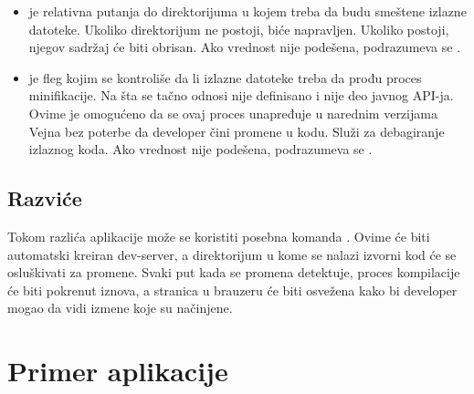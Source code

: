 \begin{itemize}
\item {} je relativna putanja do direktorijuma u kojem treba da budu smeštene izlazne datoteke.
  Ukoliko direktorijum ne postoji, biće napravljen.
  Ukoliko postoji, njegov sadržaj će biti obrisan.
  Ako vrednost nije podešena, podrazumeva se .
\item {} je fleg kojim se kontroliše da li izlazne datoteke treba da prođu proces minifikacije.
  Na šta se tačno odnosi  nije definisano i nije deo javnog API-ja.
  Ovime je omogućeno da se ovaj proces unapređuje u narednim verzijama Vejna bez poterbe da developer čini promene u kodu.
  Služi za debagiranje izlaznog koda.
  Ako vrednost nije podešena, podrazumeva se .
\end{itemize}

\subsection{Razviće}

Tokom razlića aplikacije može se koristiti posebna komanda .
Ovime će biti automatski kreiran dev-server, a  direktorijum u kome se nalazi izvorni kod će se osluškivati za promene.
Svaki put kada se promena detektuje, proces kompilacije će biti pokrenut iznova, a stranica u brauzeru će biti osvežena kako bi developer mogao da vidi izmene koje su načinjene.

\section{Primer aplikacije}

